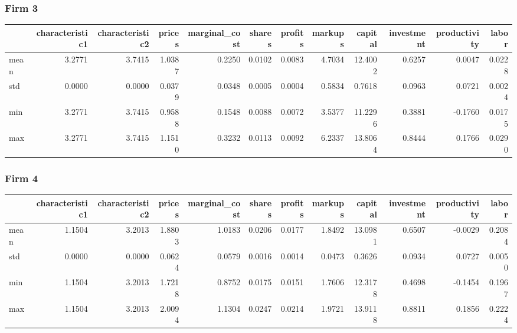  \subsubsection*{Firm 3}
\begin{tabular}{lrrrrrrrrrrr}
\toprule
{} &  characteristic1 &  characteristic2 &  prices &  marginal\_cost &  shares &  profits &  markups &  capital &  investment &  productivity &  labor \\
\midrule
mean &           3.2771 &           3.7415 &  1.0387 &         0.2250 &  0.0102 &   0.0083 &   4.7034 &  12.4002 &      0.6257 &        0.0047 & 0.0228 \\
std  &           0.0000 &           0.0000 &  0.0379 &         0.0348 &  0.0005 &   0.0004 &   0.5834 &   0.7618 &      0.0963 &        0.0721 & 0.0024 \\
min  &           3.2771 &           3.7415 &  0.9588 &         0.1548 &  0.0088 &   0.0072 &   3.5377 &  11.2296 &      0.3881 &       -0.1760 & 0.0175 \\
max  &           3.2771 &           3.7415 &  1.1510 &         0.3232 &  0.0113 &   0.0092 &   6.2337 &  13.8064 &      0.8444 &        0.1766 & 0.0290 \\
\bottomrule
\end{tabular}


 \subsubsection*{Firm 4}
\begin{tabular}{lrrrrrrrrrrr}
\toprule
{} &  characteristic1 &  characteristic2 &  prices &  marginal\_cost &  shares &  profits &  markups &  capital &  investment &  productivity &  labor \\
\midrule
mean &           1.1504 &           3.2013 &  1.8803 &         1.0183 &  0.0206 &   0.0177 &   1.8492 &  13.0981 &      0.6507 &       -0.0029 & 0.2084 \\
std  &           0.0000 &           0.0000 &  0.0624 &         0.0579 &  0.0016 &   0.0014 &   0.0473 &   0.3626 &      0.0934 &        0.0727 & 0.0050 \\
min  &           1.1504 &           3.2013 &  1.7218 &         0.8752 &  0.0175 &   0.0151 &   1.7606 &  12.3178 &      0.4698 &       -0.1454 & 0.1967 \\
max  &           1.1504 &           3.2013 &  2.0094 &         1.1304 &  0.0247 &   0.0214 &   1.9721 &  13.9118 &      0.8811 &        0.1856 & 0.2224 \\
\bottomrule
\end{tabular}


